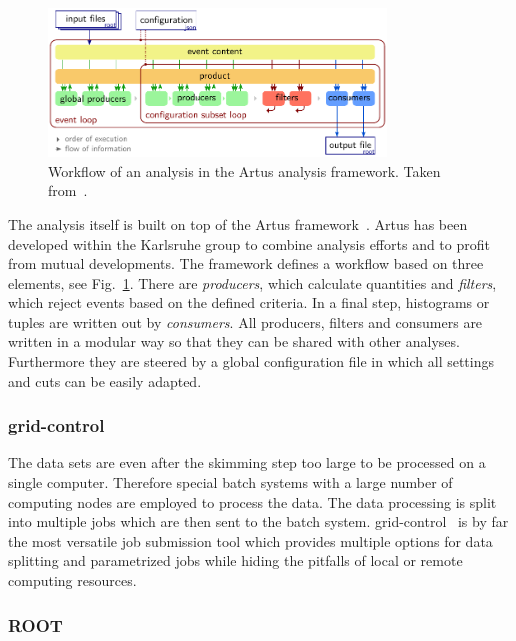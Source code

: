 \begin{figure}[htp]
    \centering
    \includegraphics[width=0.8\textwidth]{figures/cms_detector/artus_workflow.pdf}
    \caption[Workflow of an analysis in the Artus framework]{Workflow of an
        analysis in the Artus analysis framework. Taken
        from~\cite{Berger:2014aca}.}
    \label{fig:artus_workflow}
\end{figure}

The analysis itself is built on top of the Artus framework~\cite{Berger:2015qao}.
Artus has been developed within the Karlsruhe group to combine analysis efforts
and to profit from mutual developments. The framework defines a workflow based
on three elements, see Fig.~\ref{fig:artus_workflow}. There are
\emph{producers}, which calculate quantities and \emph{filters}, which reject
events based on the defined criteria. In a final step, histograms or tuples are
written out by \emph{consumers}. All producers, filters and consumers are
written in a modular way so that they can be shared with other analyses.
Furthermore they are steered by a global configuration file in which all
settings and cuts can be easily adapted.

\subsubsection{grid-control}

The data sets are even after the skimming step too large to be processed on a
single computer. Therefore special batch systems with a large number of
computing nodes are employed to process the data. The data processing is split
into multiple jobs which are then sent to the batch system.
grid-control~\cite{Gridcontrol:2015aa} is by far the most versatile job
submission tool which provides multiple options for data splitting and
parametrized jobs while hiding the pitfalls of local or remote computing
resources.

\subsubsection{ROOT}

